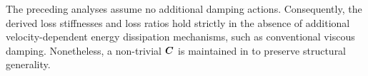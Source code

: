 The preceding analyses assume no additional damping actions.
Consequently, the derived loss stiffnesses and loss ratios hold strictly in the absence of additional velocity-dependent energy dissipation mechanisms, such as conventional viscous damping.
Nonetheless, a non-trivial $\bm{C}$ is maintained in  to preserve structural generality.